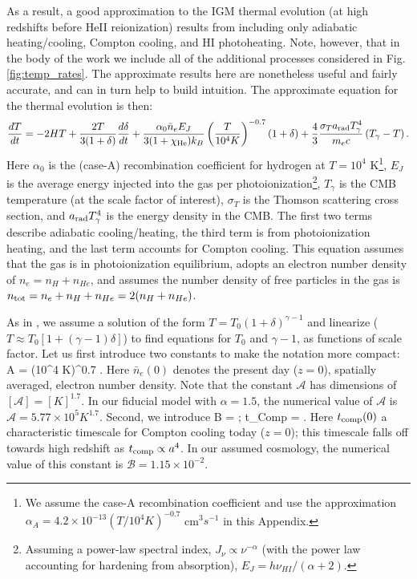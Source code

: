 As a result, a good approximation to the IGM thermal evolution (at high redshifts before HeII reionization) results
from including only adiabatic heating/cooling, Compton cooling, and HI photoheating. Note, however, that in the body of
the work we include all of the additional processes considered in Fig. \ref{fig:temp_rates}. The approximate
results here are nonetheless useful and fairly accurate, and can in turn help to build intuition.
The approximate equation for the thermal evolution is then:
\begin{align}
\frac{dT}{dt} = -2 H T + \frac{2 T}{3 (1+\delta)}\frac{d\delta}{dt} + \frac{\alpha_0 \bar{n}_e E_J}{3 (1 + \chi_{\rm He}) k_B} \left(\frac{T}{10^4 K}\right)^{-0.7} (1 + \delta) 
 + \frac{4}{3}\frac{\sigma_T a_{\rm rad} T_\gamma^4}{m_e c} \left(T_\gamma - T \right).
\label{eq:tev_approx}
\end{align}
Here $\alpha_0$ is the (case-A) recombination coefficient for hydrogen at $T=10^4$ K\footnote{We assume the case-A recombination coefficient and use the approximation $\alpha_A = 4.2 \times 10^{-13} (T/10^4 K)^{-0.7}$ cm$^3 s^{-1}$ \citep{Hui:1997dp} in this Appendix.}, $E_J$ is the average energy injected into the gas
per photoionization\footnote{Assuming a power-law spectral index, $J_\nu \propto \nu^{-\alpha}$ (with the power law accounting for hardening
from absorption), $E_J=h \nu_{HI}/(\alpha+2)$.}, $T_\gamma$ is the CMB temperature (at the scale factor of interest), $\sigma_T$ is the Thomson scattering cross
section, and $a_{\rm rad} T_\gamma^4$ is the energy
density in the CMB. The first two terms describe adiabatic cooling/heating, the third term is from photoionization heating,
and the last term accounts for Compton cooling. This equation assumes that the gas is in photoionization equilibrium, adopts an 
electron number density of $n_e = n_H + n_{He}$, and assumes the number density of free particles in the gas is $n_{\rm tot} = n_e + n_H + n_{He} =
2 (n_H + n_{He})$.

As in \citet{Hui:1997dp}, we assume a solution of the form $T = T_0 (1 + \delta)^{\gamma-1}$ and linearize ($T \approx T_0 [1+ (\gamma -1) \delta]$) to find equations
for $T_0$ and $\gamma-1$, as functions of scale factor. Let us first introduce two constants to make the notation more compact:
\beqa
{\mathcal A} = (10^4 K)^{0.7} .
\label{eq:adef}
\eeqa
Here $\bar{n}_e(0)$ denotes the present day ($z=0$), spatially averaged, electron number density.
Note that the constant ${\mathcal A}$ has dimensions of $[{\mathcal A}] = [K]^{1.7}$. In our fiducial model with $\alpha=1.5$, the
numerical value of ${\mathcal A}$ is 
${\mathcal A} = 5.77 \times 10^5 K^{1.7}$. Second, we introduce
\beqa
{\mathcal B} = ; \quad
t_{\rm Comp} = .
\label{eq:bdef}
\eeqa
Here $t_{\rm comp}(0)$ a characteristic timescale for Compton cooling today ($z=0$); this timescale falls off towards high redshift as 
$t_{\rm comp} \propto a^4$.  In our assumed cosmology, the numerical value of this constant is ${\mathcal B} = 1.15 \times 10^{-2}$.

